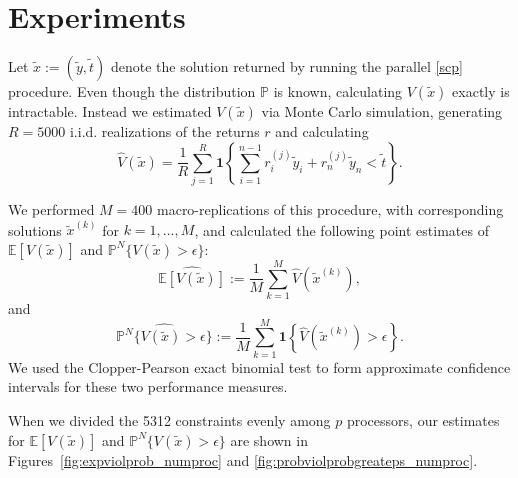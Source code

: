 \documentclass[12pt]{article}
\begin{document}
\section*{Experiments}
Let $\tilde{x} := (\tilde{y}, \tilde{t})$ denote the solution returned by running the parallel \ref{scp} procedure.
Even though the distribution $\mathbb{P}$ is known, calculating $V(\tilde{x})$ exactly is intractable.
Instead we estimated $V(\tilde{x})$ via Monte Carlo simulation, generating $R = 5000$ i.i.d. realizations of the returns $r$ and calculating
\[ \hat{V}(\tilde{x}) = \frac{1}{R} \sum_{j = 1}^R \mathbf{1}\left\{ \sum_{i=1}^{n-1} r_i^{(j)} \tilde{y}_i + r_n^{(j)} \tilde{y}_n < \tilde{t}\right\}. \]

We performed $M = 400$ macro-replications of this procedure, with corresponding solutions $\tilde{x}^{(k)}$ for $k = 1, \ldots, M$, and calculated the following point estimates of $\mathbb{E}[V(\tilde{x})]$ and $\mathbb{P}^N\{V(\tilde{x}) > \epsilon\}$:
\[ \widehat{\mathbb{E}[V(\tilde{x})]} := \frac{1}{M} \sum_{k=1}^M \hat{V}(\tilde{x}^{(k)}), \]
and
\[ \widehat{\mathbb{P}^N\{V(\tilde{x}) > \epsilon\}} := \frac{1}{M} \sum_{k=1}^M \mathbf{1}\left\{\hat{V}(\tilde{x}^{(k)}) > \epsilon\right\}. \]
We used the Clopper-Pearson exact binomial test to form approximate confidence intervals for these two performance measures.

When we divided the 5312 constraints evenly among $p$ processors, our estimates for $\mathbb{E}[V(\tilde{x})]$ and $\mathbb{P}^N\{V(\tilde{x}) > \epsilon\}$ are shown in Figures~\ref{fig:expviolprob_numproc} and \ref{fig:probviolprobgreateps_numproc}.

%
\end{document}
